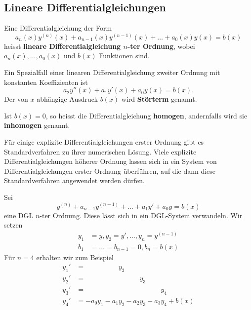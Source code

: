 \documentclass[%
draft,
11pt,%
twoside,%
titlepage,%
german,%
headsepline%
]{scrartcl}
\begin{document}
\subsection{Lineare Differentialgleichungen}

\begin{defn}
Eine Differentialgleichung der Form
$$a_n(x)y^{(n)}(x)+a_{n-1}(x)y^{(n-1)}(x)+%
\dots+a_0(x)y(x)=b(x)$$
heisst \textbf{lineare Differentialgleichung $n$-ter Ordnung}, wobei $a_n(x),\dots,a_0(x)$ und $b(x)$ Funktionen sind.
\end{defn}
\begin{bsp}
Ein Spezialfall einer linearen Differentialgleichung zweiter Ordnung mit konstanten Koeffizienten ist
$$a_2y''(x)+a_1y'(x)+a_0y(x)=b(x).$$
Der von $x$ abh\"angige Ausdruck $b(x)$ wird \textbf{St\"orterm} genannt.
\end{bsp}
\begin{defn}
Ist $b(x)=0$, so heisst die Differentialgleichung \textbf{homogen}, andernfalls wird sie \textbf{inhomogen} genannt.
\end{defn}
\begin{bem}
F\"ur einige explizite Differentialgleichungen erster Ordnung gibt es Standardverfahren zu ihrer numerischen L\"osung. Viele explizite Differentialgleichungen h\"oherer Ordnung lassen sich in ein System von Differentialgleichungen erster Ordnung \"uberf\"uhren, auf die dann diese Standardverfahren angewendet werden d\"urfen.
\end{bem}
\begin{bsp}
Sei
$$y^{(n)}+a_{n-1}y^{(n-1)}+\dots+a_1y'+a_0y=b(x)$$
eine DGL $n$-ter Ordnung. Diese l\"asst sich in ein DGL-System verwandeln. Wir setzen
\begin{align*}
y_1&=y, y_2=y',\dots,y_n=y^{(n-1)}\\
b_1&=\dots=b_{n-1}=0, b_n=b(x)
\end{align*}
F\"ur $n=4$ erhalten wir zum Beispiel
\begin{align*}
y_1'&=\phantom{-a_0y_1-a_1}y_2\\
y_2'&=\phantom{-a_0y_1-a_1y_2-a_2}y_3\\
y_3'&=\phantom{-a_0y_1-a_1y_2-a_2y_3-a_3}y_4\\
y_4'&=-a_0y_1-a_1y_2-a_2y_3-a_3y_4+b(x)
\end{align*}
\end{bsp}
\end{document}
